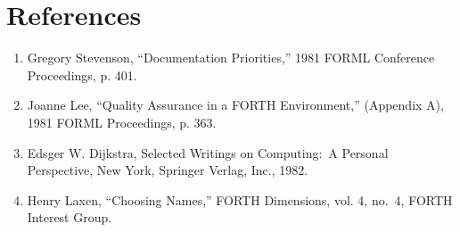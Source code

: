 \othersidetrue\section{References}
\othersidefalse
\begin{enumerate}
\item Gregory Stevenson, ``Documentation Priorities,'' 1981 FORML Conference
Proceedings, p. 401.
\item Joanne Lee, ``Quality Assurance in a FORTH Environment,'' (Appendix
A), 1981 FORML Proceedings, p. 363.
\item Edsger W. Dijkstra, Selected Writings on Computing:\ A Personal Perspective,
New York, Springer Verlag, Inc., 1982.
\item Henry Laxen, ``Choosing Names,'' FORTH Dimensions, vol. 4, no.\ 4,
FORTH Interest Group.
\end{enumerate}

